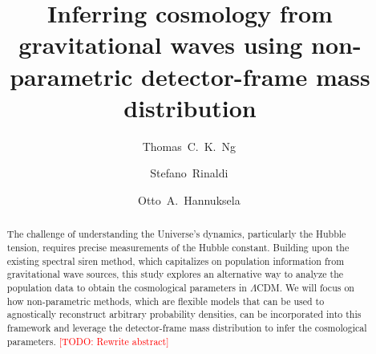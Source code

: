 \documentclass[aps,prd,twocolumn,superscriptaddress,preprintnumbers,nofootinbib,hidelinks]{revtex4-2}
\newcommand{\todo}[1]{\textcolor{red}{[TODO: #1]}}
\begin{document}
\title{Inferring cosmology from gravitational waves using non-parametric detector-frame mass distribution}

\author{Thomas~C.~K.~Ng\,}

\author{Stefano~Rinaldi\,}

\author{Otto~A.~Hannuksela\,}

\begin{abstract}
    The challenge of understanding the Universe's dynamics, particularly the Hubble tension, requires precise measurements of the Hubble constant.
    Building upon the existing spectral siren method, which capitalizes on population information from gravitational wave sources, this study explores an alternative way to analyze the population data to obtain the cosmological parameters in $\Lambda$CDM.
    We will focus on how non-parametric methods, which are flexible models that can be used to agnostically reconstruct arbitrary probability densities, can be incorporated into this framework and leverage the detector-frame mass distribution to infer the cosmological parameters.
    \todo{Rewrite abstract}
\end{abstract}

\maketitle

\begin{acronym}
\end{acronym}
\end{document}
